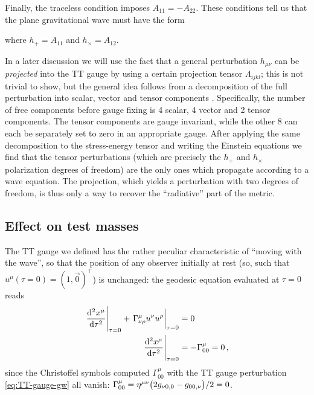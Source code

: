 \documentclass[main.tex]{subfiles}
\begin{document}
Finally, the traceless condition imposes \(A_{11} = - A_{22} \).
These conditions tell us that the plane gravitational wave must have the form 
%

%
%
where \(h_+ = A_{11} \) and \(h_\times = A_{12} \). 

In a later discussion we will use the fact that a general perturbation \(h_{\mu \nu }\) can be \emph{projected} into the \ac{TT} gauge by using a certain projection tensor \(\Lambda_{ijkl}\); this is not trivial to show, but the general idea follows from a decomposition of the full perturbation into scalar, vector and tensor components \cite[]{carrollSpacetimeGeometryIntroduction2019}.
Specifically, the number of free components before gauge fixing is 4 scalar, 4 vector and 2 tensor components. 
The tensor components are gauge invariant, while the other 8 can each be separately set to zero in an appropriate gauge.
After applying the same decomposition to the stress-energy tensor and writing the Einstein equations we find that the tensor perturbations (which are precisely the \(h_{+}\) and \(h_{ \times }\) polarization degrees of freedom) are the only ones which propagate according to a wave equation. 
The projection, which yields a perturbation with two degrees of freedom, is thus only a way to recover the ``radiative'' part of the metric. 

\subsection{Effect on test masses}

The \ac{TT} gauge we defined has the rather peculiar characteristic of ``moving with the wave'', so that the position of any observer initially at rest (so, such that \(u^{\mu } (\tau = 0 ) = (1, \vec{0})^{\top}\)) is unchanged: the geodesic equation evaluated at \(\tau = 0\) reads
%
\begin{align}
\eval{\dv[2]{x^{\mu }}{\tau}}_{\tau = 0} + \eval{\Gamma^{\mu }_{\nu \rho } u^{\nu } u^{\rho }}_{\tau = 0} &= 0   \\
\eval{\dv[2]{x^{\mu }}{\tau}}_{\tau = 0} &= - \Gamma^{\mu }_{00} = 0 
\,,
\end{align}
%
since the Christoffel symbols computed \(\Gamma^{\mu }_{00}\) with the \ac{TT} gauge perturbation \eqref{eq:TT-gauge-gw} all vanish: \(\Gamma^{\mu }_{00} = \eta^{\mu \nu } \qty( 2 g_{\nu 0,0} - g_{00, \nu }) / 2 =  0\).
\end{document}
